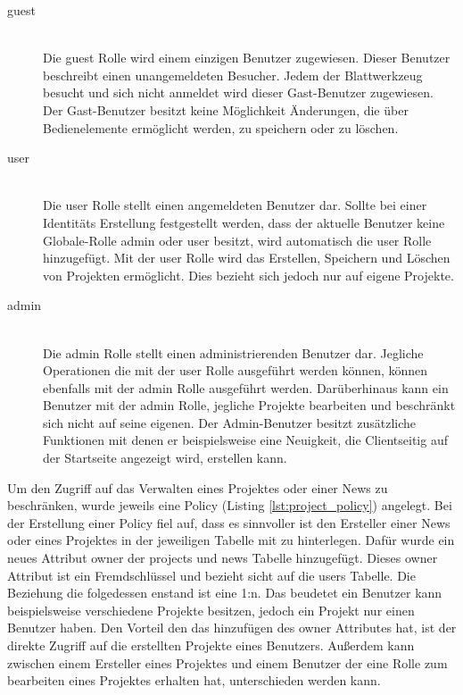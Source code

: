 \begin{description}
	\item[guest]\hfill\\
	Die guest Rolle wird einem einzigen Benutzer zugewiesen. Dieser Benutzer beschreibt einen unangemeldeten Besucher. Jedem der Blattwerkzeug besucht und sich nicht anmeldet wird dieser Gast-Benutzer zugewiesen. Der Gast-Benutzer besitzt keine Möglichkeit Änderungen, die über Bedienelemente ermöglicht werden, zu speichern oder zu löschen.
	\item[user]\hfill\\
	Die user Rolle stellt einen angemeldeten Benutzer dar. Sollte bei einer Identitäts Erstellung festgestellt werden, dass der aktuelle Benutzer keine Globale-Rolle admin oder user besitzt, wird automatisch die user Rolle hinzugefügt. Mit der user Rolle wird das Erstellen, Speichern und Löschen von Projekten ermöglicht. Dies bezieht sich jedoch nur auf eigene Projekte.
	\item[admin]\hfill\\
	Die admin Rolle stellt einen administrierenden Benutzer dar. Jegliche Operationen die mit der user Rolle ausgeführt werden können, können ebenfalls mit der admin Rolle ausgeführt werden. Darüberhinaus kann ein Benutzer mit der admin Rolle, jegliche Projekte bearbeiten und beschränkt sich nicht auf seine eigenen. Der Admin-Benutzer besitzt zusätzliche Funktionen mit denen er beispielsweise eine Neuigkeit, die Clientseitig auf der Startseite angezeigt wird, erstellen kann.
\end{description}

Um den Zugriff auf das Verwalten eines Projektes oder einer News zu beschränken, wurde jeweils eine Policy (Listing \ref{lst:project_policy}) angelegt. Bei der Erstellung einer Policy fiel auf, dass es sinnvoller ist den Ersteller einer News oder eines Projektes in der jeweiligen Tabelle mit zu hinterlegen. Dafür wurde ein neues Attribut owner der projects und news Tabelle hinzugefügt. Dieses owner Attribut ist ein Fremdschlüssel und bezieht sicht auf die users Tabelle. Die Beziehung die folgedessen enstand ist eine 1:n. Das beudetet ein Benutzer kann beispielsweise verschiedene Projekte besitzen, jedoch ein Projekt nur einen Benutzer haben. Den Vorteil den das hinzufügen des owner Attributes hat, ist der direkte Zugriff auf die erstellten Projekte eines Benutzers. Außerdem kann zwischen einem Ersteller eines Projektes und einem Benutzer der eine Rolle zum bearbeiten eines Projektes erhalten hat, unterschieden werden kann.

